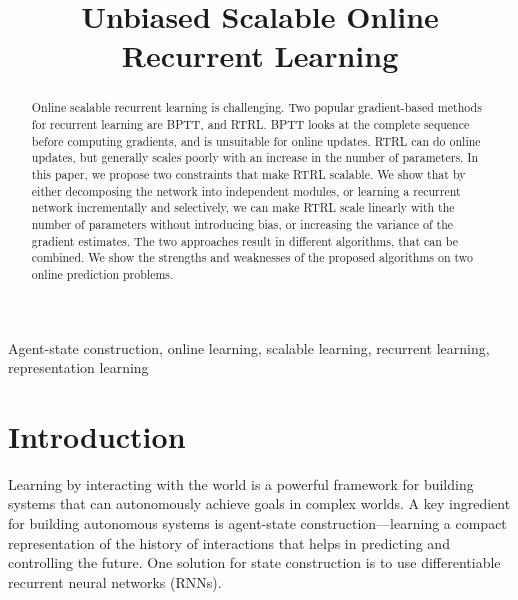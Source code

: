 \documentclass[twoside,11pt]{article}
\begin{document}
\title{Unbiased Scalable Online Recurrent Learning}
%

\maketitle

\begin{abstract}%
Online scalable recurrent learning is challenging. Two popular gradient-based methods for recurrent learning are BPTT, and RTRL. BPTT looks at the complete sequence before computing gradients, and is unsuitable for online updates. RTRL can do online updates, but generally scales poorly with an increase in the number of parameters. In this paper, we propose two constraints that make RTRL scalable. We show that by either decomposing the network into independent modules, or learning a recurrent network incrementally and selectively, we can make RTRL scale linearly with the number of parameters without introducing bias, or increasing the variance of the gradient estimates. The two approaches result in different algorithms, that can be combined. We show the strengths and weaknesses of the proposed algorithms on two online prediction problems. 
\end{abstract}

\begin{keywords}
 Agent-state construction, online learning, scalable learning, recurrent learning, representation learning
\end{keywords}

\section{Introduction}
Learning by interacting with the world is a powerful framework for building systems that can autonomously achieve goals in complex worlds. A key ingredient for building autonomous systems is agent-state construction---learning a compact representation of the history of interactions that helps in predicting and controlling the future. One solution for state construction is to use differentiable recurrent neural networks (RNNs). 
\end{document}

